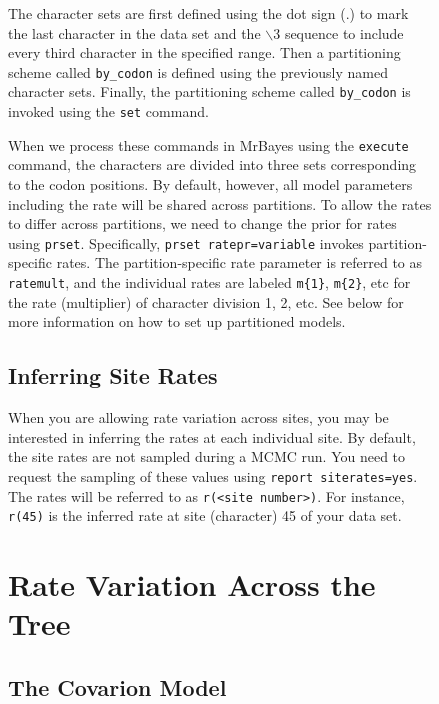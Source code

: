 \documentclass[12pt]{book}
\newcommand{\ttt}[1]{\texttt{#1}}
\begin{document}
\begin{figure}[h]
The character sets are first defined using the dot sign (.) to mark the last character in the data
set and the $\backslash$3 sequence to include every third character in the specified range. Then a
partitioning scheme called \ttt{by\_codon} is defined using the previously named character sets.
Finally, the partitioning scheme called \ttt{by\_codon} is invoked using the \ttt{set} command.

When we process these commands in MrBayes using the \ttt{execute} command, the characters are
divided into three sets corresponding to the codon positions. By default, however, all model
parameters including the rate will be shared across partitions. To allow the rates to differ across
partitions, we need to change the prior for rates using \ttt{prset}. Specifically, \ttt{prset
ratepr=variable} invokes partition-specific rates. The partition-specific rate parameter is
referred to as \ttt{ratemult}, and the individual rates are labeled \ttt{m\{1\}}, \ttt{m\{2\}}, etc
for the rate (multiplier) of character division 1, 2, etc. See below for more information on how to
set up partitioned models.

\subsection{Inferring Site Rates}

When you are allowing rate variation across sites, you may be interested in inferring the rates at
each individual site. By default, the site rates are not sampled during a MCMC run. You need to
request the sampling of these values using \ttt{report siterates=yes}. The rates will be referred
to as \ttt{r(<site number>)}. For instance, \ttt{r(45)} is the inferred rate at site (character) 45
of your data set.

\section{Rate Variation Across the Tree}

\subsection{The Covarion Model}


\end{figure}
\end{document}
